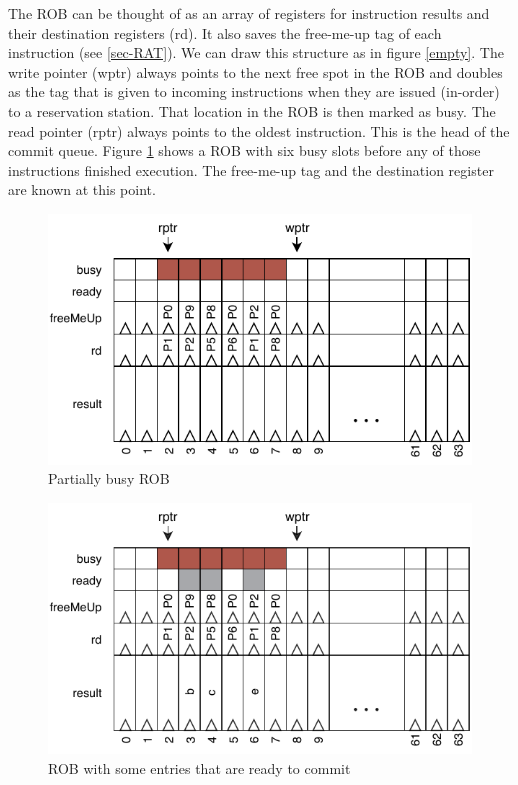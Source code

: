 \documentclass[12pt,a4paper]{article} %
\begin{document}
The ROB can be thought of as an array of registers for instruction results and their destination registers (rd). It also saves the free-me-up tag of each instruction (see \ref{sec-RAT}). We can draw this structure as in figure \ref{empty}. The write pointer (wptr) always points to the next free spot in the ROB and doubles as the tag that is given to incoming instructions when they are issued (in-order) to a reservation station. That location in the ROB is then marked as busy. The read pointer (rptr) always points to the oldest instruction. This is the head of the commit queue. Figure \ref{partiallyBusy} shows a ROB with six busy slots before any of those instructions finished execution. The free-me-up tag and the destination register are known at this point. 
\begin{figure}[H]
	\includegraphics[width=\textwidth]{Source/ROB/ROB-Busy.pdf}
	\caption{Partially busy ROB}%
	\label{partiallyBusy} 
\end{figure}%
\begin{figure}[H]
	\includegraphics[width=\textwidth]{Source/ROB/ROB-PartiallyReady.pdf}
	\caption{ROB with some entries that are ready to commit} 
	\label{partiallyReady}
\end{figure}%
\end{document}
